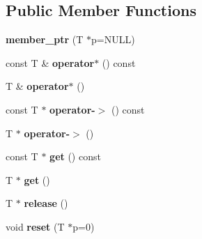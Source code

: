 \subsection*{Public Member Functions}
\begin{DoxyCompactItemize}
\item 
\hypertarget{classmember__ptr_a07de11b50740176cd87957cb3ed3d3b8}{
{\bfseries member\_\-ptr} (T $\ast$p=NULL)}
\label{classmember__ptr_a07de11b50740176cd87957cb3ed3d3b8}

\item 
\hypertarget{classmember__ptr_a7964462210e9bfa905321fb96123cd7c}{
const T \& {\bfseries operator$\ast$} () const }
\label{classmember__ptr_a7964462210e9bfa905321fb96123cd7c}

\item 
\hypertarget{classmember__ptr_a79eefdcba17bcadd54dff9b3b4948937}{
T \& {\bfseries operator$\ast$} ()}
\label{classmember__ptr_a79eefdcba17bcadd54dff9b3b4948937}

\item 
\hypertarget{classmember__ptr_a80899bba6f7a5baf39f4f40f2029fa99}{
const T $\ast$ {\bfseries operator-\/$>$} () const }
\label{classmember__ptr_a80899bba6f7a5baf39f4f40f2029fa99}

\item 
\hypertarget{classmember__ptr_af129ccfbdb03a896c933bf5cd00c31b0}{
T $\ast$ {\bfseries operator-\/$>$} ()}
\label{classmember__ptr_af129ccfbdb03a896c933bf5cd00c31b0}

\item 
\hypertarget{classmember__ptr_a35c2209287e1c2db5f72fc078ea38855}{
const T $\ast$ {\bfseries get} () const }
\label{classmember__ptr_a35c2209287e1c2db5f72fc078ea38855}

\item 
\hypertarget{classmember__ptr_ae2feaf010df5dbe2ac54dc02ccb976ed}{
T $\ast$ {\bfseries get} ()}
\label{classmember__ptr_ae2feaf010df5dbe2ac54dc02ccb976ed}

\item 
\hypertarget{classmember__ptr_a3e2476e6f94e4f472b1ae3cf26d94a16}{
T $\ast$ {\bfseries release} ()}
\label{classmember__ptr_a3e2476e6f94e4f472b1ae3cf26d94a16}

\item 
\hypertarget{classmember__ptr_a0191c833924d93e9093b07bab31010fe}{
void {\bfseries reset} (T $\ast$p=0)}
\label{classmember__ptr_a0191c833924d93e9093b07bab31010fe}

\end{DoxyCompactItemize}
